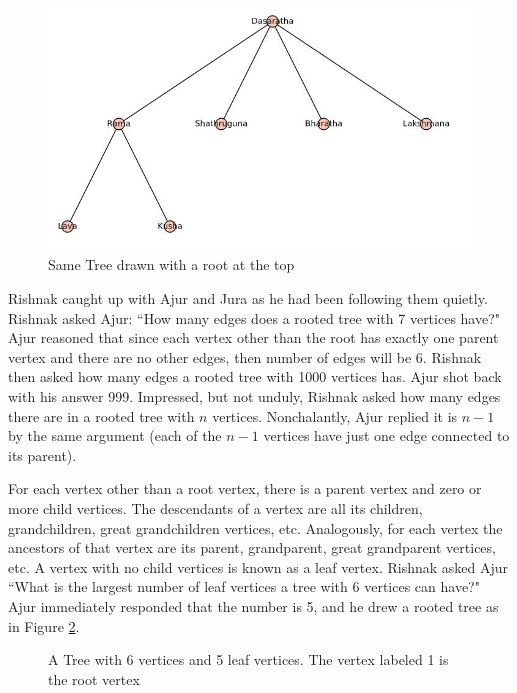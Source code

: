\begin{figure}
\begin{center}
\includegraphics[width=\textwidth]{tree2.JPG}
\caption{Same Tree drawn with a root at the top}\label{rg2}
\end{center}
\end{figure}

Rishnak caught up with Ajur and Jura as he had been following them quietly. Rishnak asked Ajur: ``How many edges does a rooted tree with 7 vertices have?" Ajur reasoned that since each vertex other than the root has exactly one parent vertex and there are no other edges, then number of edges will be 6. Rishnak then asked how many edges a rooted tree with 1000 vertices has. Ajur shot back with his answer 999. Impressed, but not unduly, Rishnak asked how many edges there are in a rooted tree with $n$ vertices. Nonchalantly, Ajur replied it is $n-1$ by the same argument (each of the $n-1$ vertices have just one edge connected to its parent).  

For each vertex other than a root vertex, there is a parent vertex and zero or more child vertices.  The descendants of a vertex are all its children, grandchildren, great grandchildren vertices, etc. Analogously, for each vertex the ancestors of that vertex are its parent, grandparent, great grandparent vertices, etc. 
A vertex with no child vertices is known as a leaf vertex. Rishnak asked Ajur ``What is the largest number of leaf vertices a tree with 6 vertices can have?" Ajur immediately responded that the number is 5, and he drew a rooted tree as in Figure \ref{t1}.

\begin{figure}
\begin{center}
\caption{A Tree with 6 vertices and 5 leaf vertices. The vertex labeled 1 is the root vertex}\label{t1}
\end{center}
\end{figure}

